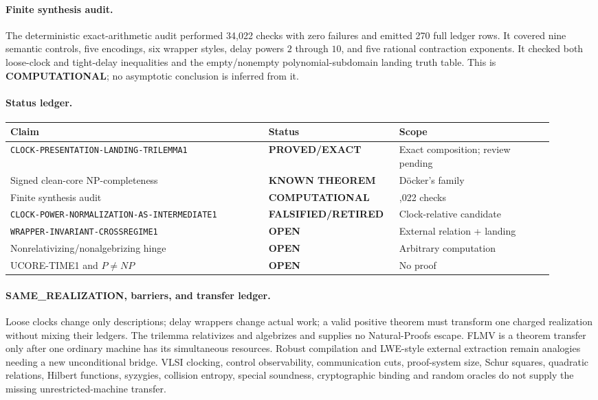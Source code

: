 \documentclass[11pt]{article}
\newcommand{\statusproved}{\textcolor{proved}{\textbf{PROVED/EXACT}}}
\newcommand{\statusopen}{\textcolor{openstatus}{\textbf{OPEN}}}
\newcommand{\statusretired}{\textcolor{retired}{\textbf{FALSIFIED/RETIRED}}}
\begin{document}
\paragraph{Finite synthesis audit.}
The deterministic exact-arithmetic audit performed 34,022 checks with zero
failures and emitted 270 full ledger rows.  It covered nine semantic controls,
five encodings, six wrapper styles, delay powers \(2\) through \(10\), and
five rational contraction exponents.  It checked both loose-clock and
tight-delay inequalities and the empty/nonempty polynomial-subdomain landing
truth table.  This is \textbf{COMPUTATIONAL}; no asymptotic conclusion is
inferred from it.

\paragraph{Status ledger.}
\begin{center}\scriptsize
\begin{tabular}{>{\raggedright\arraybackslash}p{0.45\linewidth}>{\raggedright\arraybackslash}p{0.20\linewidth}>{\raggedright\arraybackslash}p{0.27\linewidth}}
\toprule
Claim & Status & Scope\\ \midrule
\texttt{CLOCK-PRESENTATION-LANDING-TRILEMMA1} & \statusproved & Exact composition; review pending\\
Signed clean-core NP-completeness & \textbf{KNOWN THEOREM} & D\"ocker's family\\
Finite synthesis audit & \textbf{COMPUTATIONAL} & 34,022 checks\\
\texttt{CLOCK-POWER-NORMALIZATION-AS-INTERMEDIATE1} & \statusretired & Clock-relative candidate\\
\texttt{WRAPPER-INVARIANT-CROSSREGIME1} & \statusopen & External relation + landing\\
Nonrelativizing/nonalgebrizing hinge & \statusopen & Arbitrary computation\\
UCORE-TIME1 and \(P\ne NP\) & \statusopen & No proof\\
\bottomrule
\end{tabular}
\end{center}

\paragraph{SAME\_REALIZATION, barriers, and transfer ledger.}
Loose clocks change only descriptions; delay wrappers change actual work; a
valid positive theorem must transform one charged realization without mixing
their ledgers.  The trilemma relativizes and algebrizes and supplies no
Natural-Proofs escape.  FLMV is a theorem transfer only after one ordinary
machine has its simultaneous resources.  Robust compilation and LWE-style
external extraction remain analogies needing a new unconditional bridge.
VLSI clocking, control observability, communication cuts, proof-system size,
Schur squares, quadratic relations, Hilbert functions, syzygies, collision
entropy, special soundness, cryptographic binding and random oracles do not
supply the missing unrestricted-machine transfer.
\end{document}
